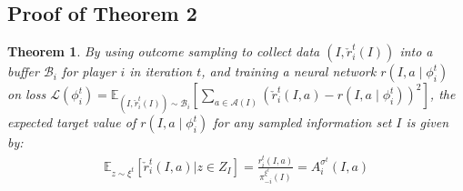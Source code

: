 \documentclass[letterpaper]{article} %
\makeatletter
\newtheorem{theorem}{Theorem}
\renewenvironment{align*}{%
  \linenomath 
  \start@align\@ne\st@rredtrue\m@ne
}{%
  \endalign
  \endlinenomath 
}
\makeatother
\begin{document}
\subsection{Proof of Theorem 2}
\begin{theorem}
    By using outcome sampling to collect data $(I, \check{r}_i^t(I))$ into a buffer $\mathcal{B}_i$ for player $i$ in iteration $t$, and training a neural network $r(I, a \mid \phi_i^t)$ on loss $\mathcal{L}(\phi_i^t)=\mathbb{E}_{(I, \check{r}_i^t(I))\sim \mathcal{B}_i}\left[\sum_{a\in \mathcal{A}(I)}^{}\left(\check{r}_i^t(I, a) - r(I, a \mid \phi_i^t)\right)^2\right] $, the expected target value of $r(I, a \mid \phi_i^t)$ for any sampled information set $I$ is given by:
\begin{align*}
    \mathbb{E}_{z \sim \xi^t}\left[ \check{r}_i^{t}(I, a) \vert z \in Z_I\right] =  \frac{r_i^t(I, a)}{\pi_{-i}^{\xi^t}(I) } =A_i^{\sigma^t}(I, a)
\end{align*}
\end{theorem}
\end{document}
